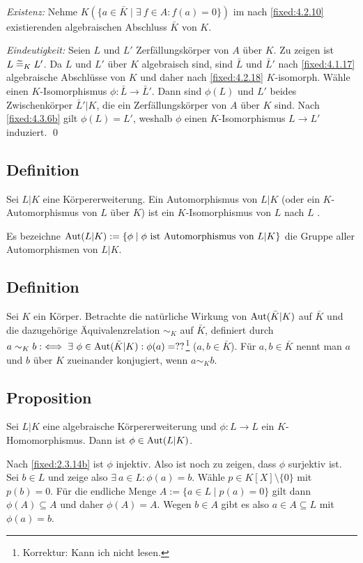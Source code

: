 \proof ~

\textit{Existenz:} Nehme $K(\{a \in \bar K \mid \exists~f \in A : f(a) = 0\})$ im nach \ref{fixed:4.2.10} existierenden algebraischen Abschluss $\bar K$ von $K$.

\textit{Eindeutigkeit:} Seien $L$ und $L'$ Zerfällungskörper von $A$ über $K$. Zu zeigen ist $L \mathrel{\widetilde{=}}_K L'$. Da $L$ und $L'$ über $K$ algebraisch sind, sind $\bar L$ und $\bar L'$ nach \ref{fixed:4.1.17} algebraische Abschlüsse von $K$ und daher nach \ref{fixed:4.2.18} $K$-isomorph. Wähle einen $K$-Isomorphismus $\phi : \bar L \to \bar L'$. Dann sind $\phi(L)$ und $L'$ beides Zwischenkörper $\bar L'|K$, die ein Zerfällungskörper von $A$ über $K$ sind. Nach \ref{fixed:4.3.6b} gilt $\phi(L) = L'$, weshalb $\phi$ einen $K$-Isomorphismus $L \to L'$ induziert. \qed

\subsection{Definition} Sei $L|K$ eine Körpererweiterung. Ein Automorphismus von $L|K$ (oder ein $K$-Automorphismus von $L$ über $K$) ist ein $K$-Isomorphismus von $L$ nach $L$ \ALref{\ref{fixed:4.2.13}}.

Es bezeichne $\operatorname{Aut}(L|K) := \{ \phi \mid \text{$\phi$ ist Automorphismus von $L|K$} \}$ die Gruppe aller Automorphismen von $L|K$.

\subsection{Definition} Sei $K$ ein Körper. Betrachte die natürliche Wirkung von $\operatorname{Aut}(\bar K|K)$ auf $\bar K$ und die dazugehörige Äquivalenzrelation $\sim_K$ auf $\bar K$, definiert durch $a \sim_K b :\iff \exists~\phi \in \operatorname{Aut}(\bar K|K) : \phi(a)=??$\footnote{Korrektur: Kann ich nicht lesen.} ($a,b \in \bar K$). Für $a,b \in \bar K$ nennt man $a$ und $b$ über $K$ zueinander konjugiert, wenn $a \sim_K b$.

\subsection{Proposition} Sei $L|K$ eine algebraische Körpererweiterung und $\phi:L \to L$ ein $K$-Homomorphismus. Dann ist $\phi \in \operatorname{Aut}(L|K)$.

\proof Nach \ref{fixed:2.3.14b} ist $\phi$ injektiv. Also ist noch zu zeigen, dass $\phi$ surjektiv ist. Sei $b \in L$ und zeige also $\exists~a \in L : \phi(a) =b$. Wähle $p \in K[X] \setminus \{0\}$ mit $p(b) = 0$. Für die endliche Menge $A := \{a \in L \mid p(a) =0 \}$ gilt dann $\phi(A) \subseteq A$ und daher $\phi(A) =A$. Wegen $b \in A$ gibt es also $a \in A \subseteq L$ mit $\phi(a) = b$.

